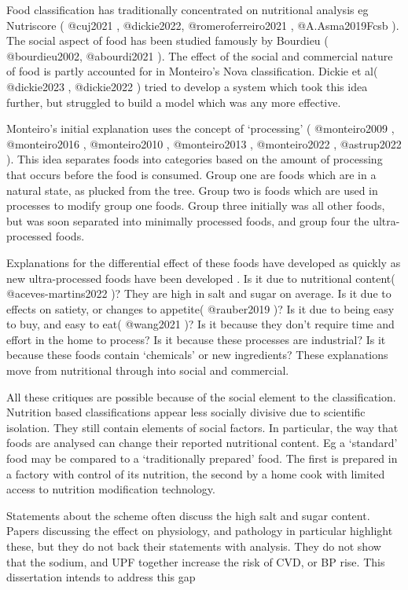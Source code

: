 \documentclass[
]{article}
\begin{document}
Food classification has traditionally concentrated on nutritional
analysis eg Nutriscore ( @cuj2021 , @dickie2022, @romeroferreiro2021 ,
@A.Asma2019Fcsb ). The social aspect of food has been studied famously
by Bourdieu ( @bourdieu2002, @abourdi2021 ). The effect of the social
and commercial nature of food is partly accounted for in Monteiro's Nova
classification. Dickie et al( @dickie2023 , @dickie2022 ) tried to
develop a system which took this idea further, but struggled to build a
model which was any more effective.

Monteiro's initial explanation uses the concept of `processing' (
@monteiro2009 , @monteiro2016 , @monteiro2010 , @monteiro2013 ,
@monteiro2022 , @astrup2022 ). This idea separates foods into categories
based on the amount of processing that occurs before the food is
consumed. Group one are foods which are in a natural state, as plucked
from the tree. Group two is foods which are used in processes to modify
group one foods. Group three initially was all other foods, but was soon
separated into minimally processed foods, and group four the
ultra-processed foods.

Explanations for the differential effect of these foods have developed
as quickly as new ultra-processed foods have been developed . Is it due
to nutritional content( @aceves-martins2022 )? They are high in salt and
sugar on average. Is it due to effects on satiety, or changes to
appetite( @rauber2019 )? Is it due to being easy to buy, and easy to
eat( @wang2021 )? Is it because they don't require time and effort in
the home to process? Is it because these processes are industrial? Is it
because these foods contain `chemicals' or new ingredients? These
explanations move from nutritional through into social and commercial.

All these critiques are possible because of the social element to the
classification. Nutrition based classifications appear less socially
divisive due to scientific isolation. They still contain elements of
social factors. In particular, the way that foods are analysed can
change their reported nutritional content. Eg a `standard' food may be
compared to a `traditionally prepared' food. The first is prepared in a
factory with control of its nutrition, the second by a home cook with
limited access to nutrition modification technology.

Statements about the scheme often discuss the high salt and sugar
content. Papers discussing the effect on physiology, and pathology in
particular highlight these, but they do not back their statements with
analysis. They do not show that the sodium, and UPF together increase
the risk of CVD, or BP rise. This dissertation intends to address this
gap
\end{document}
